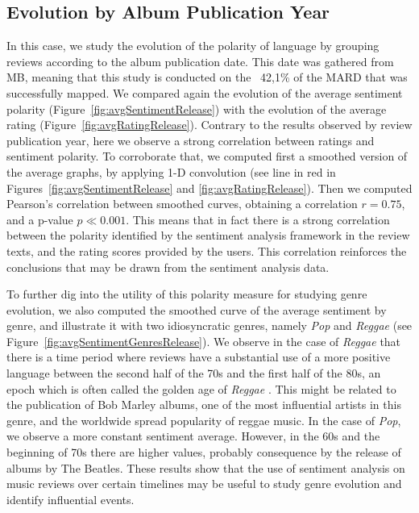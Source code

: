 \subsection{Evolution by Album Publication Year}

In this case, we study the evolution of the polarity of language by grouping reviews according to the album publication date. This date was gathered from MB, meaning that this study is conducted on the ~42,1\% of the MARD that was successfully mapped. We compared again the evolution of the average sentiment polarity (Figure~\ref{fig:avgSentimentRelease}) with the evolution of the average rating (Figure~\ref{fig:avgRatingRelease}). Contrary to the results observed by review publication year, here we observe a strong correlation between ratings and sentiment polarity. To corroborate that, we computed first a smoothed version of the average graphs, by applying 1-D convolution (see line in red in Figures~\ref{fig:avgSentimentRelease} and \ref{fig:avgRatingRelease}). Then we computed Pearson's correlation between smoothed curves, obtaining a correlation $r = 0.75$, and a p-value $p \ll 0.001$. This means that in fact there is a strong correlation between the polarity identified by the sentiment analysis framework in the review texts, and the rating scores provided by the users. This correlation reinforces the conclusions that may be drawn from the sentiment analysis data. %

To further dig into the utility of this polarity measure for studying genre evolution, we also computed the smoothed curve of the average sentiment by genre, and illustrate it with two idiosyncratic genres, namely \textit{Pop} and \textit{Reggae} (see  Figure~\ref{fig:avgSentimentGenresRelease}). We observe in the case of \textit{Reggae} that there is a time period where reviews have a substantial use of a more positive language between the second half of the 70s and the first half of the 80s, an epoch which is often called the golden age of \textit{Reggae} \cite{alleyne2012encyclopedia}. This might be related to the publication of Bob Marley albums, one of the most influential artists in this genre, and the worldwide spread popularity of reggae music. In the case of \textit{Pop}, we observe a more constant sentiment average. However, in the 60s and the beginning of 70s there are higher values, probably consequence by the release of albums by The Beatles. These results show that the use of sentiment analysis on music reviews over certain timelines may be useful to study genre evolution and identify influential events.


